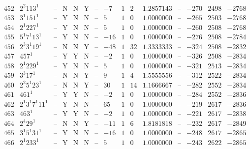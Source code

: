 \documentclass[11pt,reqno,a4letter]{article}
\numberwithin{figure}{section}
\numberwithin{table}{section}
\theoremstyle{plain}
\numberwithin{theorem}{section}
\theoremstyle{definition}
\begin{document}
\begin{table}[h!]
\begin{equation*}
{\begin{array}{|cc|c|ccc|c|c|ccc|c|ccc}
 452 & 2^2 113^1 & \text{--} & \text{N} & \text{N} & \text{Y} & \text{--} & -7 & 1 & 2 & 1.2857143 & \text{--} & -270 & 2498 & -2768 \\
 453 & 3^1 151^1 & \text{--} & \text{Y} & \text{N} & \text{N} & \text{--} & 5 & 1 & 0 & 1.0000000 & \text{--} & -265 & 2503 & -2768 \\
 454 & 2^1 227^1 & \text{--} & \text{Y} & \text{N} & \text{N} & \text{--} & 5 & 1 & 0 & 1.0000000 & \text{--} & -260 & 2508 & -2768 \\
 455 & 5^1 7^1 13^1 & \text{--} & \text{Y} & \text{N} & \text{N} & \text{--} & -16 & 1 & 0 & 1.0000000 & \text{--} & -276 & 2508 & -2784 \\
 456 & 2^3 3^1 19^1 & \text{--} & \text{N} & \text{N} & \text{Y} & \text{--} & -48 & 1 & 32 & 1.3333333 & \text{--} & -324 & 2508 & -2832 \\
 457 & 457^1 & \text{--} & \text{Y} & \text{Y} & \text{N} & \text{--} & -2 & 1 & 0 & 1.0000000 & \text{--} & -326 & 2508 & -2834 \\
 458 & 2^1 229^1 & \text{--} & \text{Y} & \text{N} & \text{N} & \text{--} & 5 & 1 & 0 & 1.0000000 & \text{--} & -321 & 2513 & -2834 \\
 459 & 3^3 17^1 & \text{--} & \text{N} & \text{N} & \text{Y} & \text{--} & 9 & 1 & 4 & 1.5555556 & \text{--} & -312 & 2522 & -2834 \\
 460 & 2^2 5^1 23^1 & \text{--} & \text{N} & \text{N} & \text{Y} & \text{--} & 30 & 1 & 14 & 1.1666667 & \text{--} & -282 & 2552 & -2834 \\
 461 & 461^1 & \text{--} & \text{Y} & \text{Y} & \text{N} & \text{--} & -2 & 1 & 0 & 1.0000000 & \text{--} & -284 & 2552 & -2836 \\
 462 & 2^1 3^1 7^1 11^1 & \text{--} & \text{Y} & \text{N} & \text{N} & \text{--} & 65 & 1 & 0 & 1.0000000 & \text{--} & -219 & 2617 & -2836 \\
 463 & 463^1 & \text{--} & \text{Y} & \text{Y} & \text{N} & \text{--} & -2 & 1 & 0 & 1.0000000 & \text{--} & -221 & 2617 & -2838 \\
 464 & 2^4 29^1 & \text{--} & \text{N} & \text{N} & \text{Y} & \text{--} & -11 & 1 & 6 & 1.8181818 & \text{--} & -232 & 2617 & -2849 \\
 465 & 3^1 5^1 31^1 & \text{--} & \text{Y} & \text{N} & \text{N} & \text{--} & -16 & 1 & 0 & 1.0000000 & \text{--} & -248 & 2617 & -2865 \\
 466 & 2^1 233^1 & \text{--} & \text{Y} & \text{N} & \text{N} & \text{--} & 5 & 1 & 0 & 1.0000000 & \text{--} & -243 & 2622 & -2865 \\

\end{array}}
\end{equation*}
\end{table}
\end{document}
